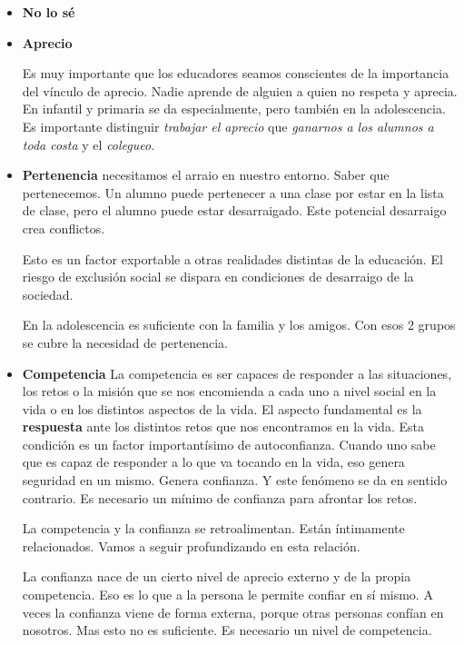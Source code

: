 \documentclass[palatino]{apuntesURJC}
\begin{document}
\begin{itemize}


	\item \textbf{No lo sé}

	\item \textbf{Aprecio}

Es muy importante que los educadores seamos conscientes de la importancia del vínculo de aprecio. 
%
Nadie aprende de alguien a quien no respeta y aprecia. 
%
En infantil y primaria se da especialmente, pero también en la adolescencia.
%
Es importante distinguir \textit{trabajar el aprecio} que \textit{ganarnos a los alumnos a toda costa} y el \textit{colegueo}.

	\item \textbf{Pertenencia} necesitamos el arraio en nuestro entorno. Saber que pertenecemos. 
%
Un alumno puede pertenecer a una clase por estar en la lista de clase, pero el alumno puede estar desarraigado. 
%
Este potencial desarraigo crea conflictos.

Esto es un factor exportable a otras realidades distintas de la educación. 
%
El riesgo de exclusión social se dispara en condiciones de desarraigo de la sociedad.

En la adolescencia es suficiente con la familia y los amigos. 
%
Con esos 2 grupos se cubre la necesidad de pertenencia.

	\item \textbf{Competencia} La competencia es ser capaces de responder a las situaciones, los retos o la misión que se nos encomienda a cada uno a nivel social en la vida o en los distintos aspectos de la vida. 
	El aspecto fundamental es la \textbf{respuesta} ante los distintos retos que nos encontramos en la vida.
	Esta condición es un factor importantísimo de autoconfianza. 
	Cuando uno sabe que es capaz de responder a lo que va tocando en la vida, eso genera seguridad en un mismo. Genera confianza.
	Y este fenómeno se da en sentido contrario.
	Es necesario un mínimo de confianza para afrontar los retos.

	La competencia y la confianza se retroalimentan. Están íntimamente relacionados.
	Vamos a seguir profundizando en esta relación.

	La confianza nace de un cierto nivel de aprecio externo y de la propia competencia. 
	Eso es lo que a la persona le permite confiar en sí mismo.
	A veces la confianza viene de forma externa, porque otras personas confían en nosotros. 
	Mas esto no es suficiente.
	Es necesario un nivel de competencia.


\end{itemize}
\end{document}
